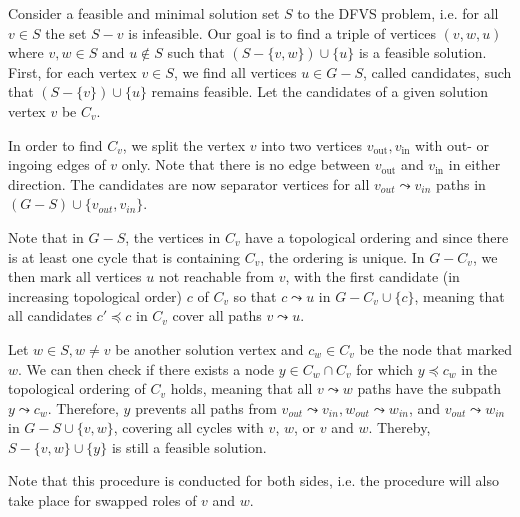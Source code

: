 Consider a feasible and minimal solution set $S$ to the DFVS problem, i.e. for all $v \in S$ the set $S - v$ is infeasible. 
Our goal is to find a triple of vertices $(v,w,u)$ where $v,w\in S$ and $u\notin S$ such that $\left(S-\{v,w\}\right)\cup \{u\}$ is a feasible solution.
First, for each vertex $v \in S$, we find all vertices $u \in G-S$, called candidates, such that $\left(S-\{v\}\right)\cup \{u\}$ remains feasible. 
Let the candidates of a given solution vertex $v$ be $C_v$. 

In order to find $C_v$, we split the vertex $v$ into two vertices $v_{\text{out}}, v_{\text{in}}$ with out- or ingoing edges of $v$ only. Note that there is no edge between $v_{\text{out}}$ and $v_{\text{in}}$ in either direction. The candidates are now separator vertices for all $v_{out} \leadsto v_{in}$ paths in  $(G-S)\cup \{v_{out}, v_{in}\}$. 

Note that in $G-S$, the vertices in $C_v$  have a topological ordering and since there is at least one cycle that is containing  $C_v$, the ordering is unique.
In $G-C_v$, we then mark all vertices $u$ not reachable from $v$, with the first candidate (in increasing topological order) $c$ of $C_v$ so that $c \leadsto u$ in $G-C_v \cup \{c\}$, meaning that all candidates $c' \preceq c$ in $C_v$ cover all paths $v \leadsto u$. 

Let $w \in S, w \neq v$ be another solution vertex and $c_w \in C_v$ be the node that marked $w$. We can then check if there exists a node $y \in C_w \cap C_v$ for which $y \preceq c_w$ in the topological ordering of $C_v$ holds, meaning that all $v \leadsto w$ paths have the subpath $y \leadsto c_w$. 
Therefore, $y$ prevents all paths from $v_{out} \leadsto v_{in}, w_{out}\leadsto w_{in}$, and $v_{out} \leadsto w_{in}$ in $G-S \cup \{v, w\}$, covering all cycles with $v$, $w$, or $v$ and $w$. Thereby, $S - \{v, w\} \cup \{y\}$ is still a feasible solution.

Note that this procedure is conducted for both sides, i.e. the procedure will also take place for swapped roles of $v$ and $w$.